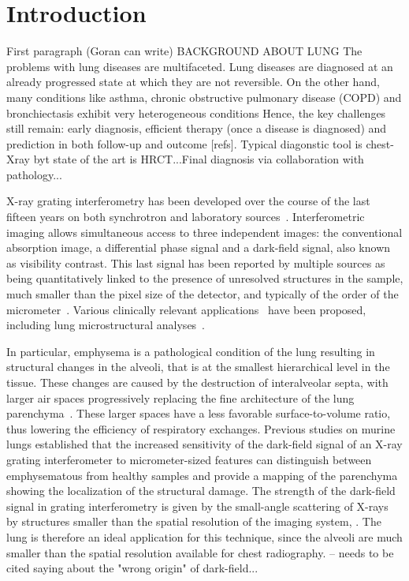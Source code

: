 \section{Introduction}\label{sec:introduction}
First paragraph (Goran can write) BACKGROUND ABOUT LUNG
The problems with lung diseases are multifaceted. Lung diseases are diagnosed at an already progressed state at which they are not reversible. On the other hand, many conditions like asthma, chronic obstructive pulmonary disease (COPD) and bronchiectasis exhibit very heterogeneous conditions Hence, the key challenges still remain: early diagnosis, efficient therapy (once a disease is diagnosed) and prediction in both follow-up and outcome [refs]. Typical diagonstic tool is chest-Xray byt state of the art is HRCT...Final diagnosis via collaboration with pathology...

X-ray grating interferometry has been developed over the course of the last
  fifteen years on both synchrotron and laboratory
sources~\cite{David_2002,1347-4065-42-7B-L866,Weitkamp_2005,1347-4065-45-6R-5254,Pfeiffer2006}. Interferometric
imaging allows simultaneous access to three independent images: the
conventional absorption image, a differential phase signal and a dark-field
signal, also known as visibility contrast. This last signal has been
reported by multiple sources as being quantitatively linked to the presence
of unresolved structures in the sample, much smaller than the pixel size of
the detector, and typically of the order of the
micrometer~\cite{Pfeiffer2008,Lynch:11,Yashiro:10}.
Various clinically relevant
applications~\cite{Wen_2009,Thilo2013} have been
proposed, including lung microstructural analyses~\cite{Schleede17880,Meinel_2014,Meinel_2013,Yaroshenko_2013,Modregger2016}.

In particular, emphysema is a pathological condition of the lung
resulting in structural changes in the alveoli, that is at the smallest
hierarchical level in the tissue. These changes are caused by the
destruction of interalveolar septa, with larger air spaces progressively
replacing the fine architecture of the lung parenchyma~\cite{Sharafkhaneh_2008}. These larger spaces
have a less favorable surface-to-volume ratio, thus lowering the efficiency
of respiratory exchanges. Previous studies on murine lungs established that the increased sensitivity of
the dark-field signal of an X-ray grating interferometer to micrometer-sized
features can distinguish between emphysematous from healthy samples and
provide a mapping of the parenchyma showing the localization of the
structural damage. The strength of the dark-field signal in grating interferometry is
given by the small-angle scattering of X-rays by structures smaller than the
spatial resolution of the imaging system, . The lung is therefore an ideal
application for this technique, since the alveoli are much
smaller than the spatial resolution available for chest radiography. -- \cite{Koenig2016} needs to be cited saying about the "wrong origin" of dark-field...

